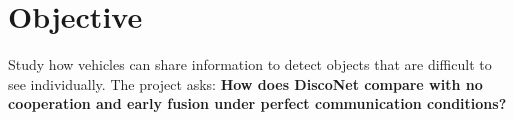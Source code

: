 \section*{Objective}
Study how vehicles can share information to detect objects that are difficult to see individually.
The project asks: \textbf{How does DiscoNet compare with no cooperation and early fusion under perfect communication conditions?}
